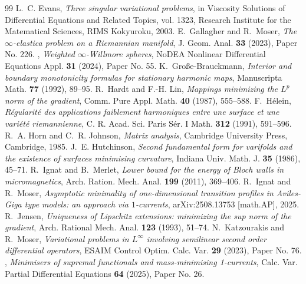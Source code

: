 \documentclass[10pt,a4paper]{amsart}
\begin{document}
\begin{thebibliography}{99}
 L.~C. Evans, \emph{Three singular variational problems}, in Viscosity Solutions of Differential Equations and Related Topics, vol. 1323, Research Institute for the Matematical Sciences, RIMS Kokyuroku, 2003.
 E.~Gallagher and R.~Moser, \emph{The {$\infty $}-elastica problem on a {R}iemannian manifold}, J. Geom. Anal. \textbf{33} (2023), Paper No. 226.
 \bysame, \emph{Weighted {$\infty$}-{W}illmore spheres}, NoDEA Nonlinear Differential Equations Appl. \textbf{31} (2024), Paper No. 55.
 K.~Gro{\ss}e-Brauckmann, \emph{Interior and boundary monotonicity formulas for stationary harmonic maps}, Manuscripta Math. \textbf{77} (1992), 89--95.
 R.~Hardt and F.-H. Lin, \emph{Mappings minimizing the {$L^p$} norm of the gradient}, Comm. Pure Appl. Math. \textbf{40} (1987), 555--588.
 F.~H\'elein, \emph{R\'egularit\'e des applications faiblement harmoniques entre une surface et une vari\'et\'e riemannienne}, C. R. Acad. Sci. Paris S{\'e}r. I Math. \textbf{312} (1991), 591--596.
 R.~A. Horn and C.~R. Johnson, \emph{Matrix analysis}, Cambridge University Press, Cambridge, 1985.
 J.~E. Hutchinson, \emph{Second fundamental form for varifolds and the existence of surfaces minimising curvature}, Indiana Univ. Math. J. \textbf{35} (1986), 45--71.
 R.~Ignat and B.~Merlet, \emph{Lower bound for the energy of {B}loch walls in micromagnetics}, Arch. Ration. Mech. Anal. \textbf{199} (2011), 369--406.
 R.~Ignat and R.~Moser, \emph{Asymptotic minimality of one-dimensional transition profiles in {A}viles-{G}iga type models: an approach via $1$-currents}, arXiv:2508.13753 [math.AP], 2025.
 R.~Jensen, \emph{Uniqueness of {L}ipschitz extensions: minimizing the sup norm of the gradient}, Arch. Rational Mech. Anal. \textbf{123} (1993), 51--74.
 N.~Katzourakis and R.~Moser, \emph{Variational problems in {$L^{\infty}$} involving semilinear second order differential operators}, ESAIM Control Optim. Calc. Var. \textbf{29} (2023), Paper No. 76.
 \bysame, \emph{Minimisers of supremal functionals and mass-minimising 1-currents}, Calc. Var. Partial Differential Equations \textbf{64} (2025), Paper No. 26.

\end{thebibliography}
\end{document}
